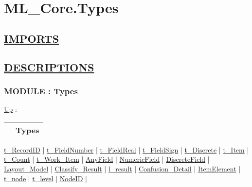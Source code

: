 \chapter*{ML\_Core.Types}
\hypertarget{ecldoc:toc:ML_Core.Types}{}

\section*{\underline{IMPORTS}}

\section*{\underline{DESCRIPTIONS}}
\subsection*{MODULE : Types}
\hypertarget{ecldoc:ML_Core.Types}{}
\hyperlink{ecldoc:toc:ML_Core}{Up} :

{\renewcommand{\arraystretch}{1.5}
\begin{tabularx}{\textwidth}{|>{\raggedright\arraybackslash}l|X|}
\hline
\hspace{0pt} & Types \\
\hline
\end{tabularx}
}

\par


\hyperlink{ecldoc:ml_core.types.t_recordid}{t\_RecordID}  |
\hyperlink{ecldoc:ml_core.types.t_fieldnumber}{t\_FieldNumber}  |
\hyperlink{ecldoc:ml_core.types.t_fieldreal}{t\_FieldReal}  |
\hyperlink{ecldoc:ml_core.types.t_fieldsign}{t\_FieldSign}  |
\hyperlink{ecldoc:ml_core.types.t_discrete}{t\_Discrete}  |
\hyperlink{ecldoc:ml_core.types.t_item}{t\_Item}  |
\hyperlink{ecldoc:ml_core.types.t_count}{t\_Count}  |
\hyperlink{ecldoc:ml_core.types.t_work_item}{t\_Work\_Item}  |
\hyperlink{ecldoc:ml_core.types.anyfield}{AnyField}  |
\hyperlink{ecldoc:ml_core.types.numericfield}{NumericField}  |
\hyperlink{ecldoc:ml_core.types.discretefield}{DiscreteField}  |
\hyperlink{ecldoc:ml_core.types.layout_model}{Layout\_Model}  |
\hyperlink{ecldoc:ml_core.types.classify_result}{Classify\_Result}  |
\hyperlink{ecldoc:ml_core.types.l_result}{l\_result}  |
\hyperlink{ecldoc:ml_core.types.confusion_detail}{Confusion\_Detail}  |
\hyperlink{ecldoc:ml_core.types.itemelement}{ItemElement}  |
\hyperlink{ecldoc:ml_core.types.t_node}{t\_node}  |
\hyperlink{ecldoc:ml_core.types.t_level}{t\_level}  |
\hyperlink{ecldoc:ml_core.types.nodeid}{NodeID}  |

